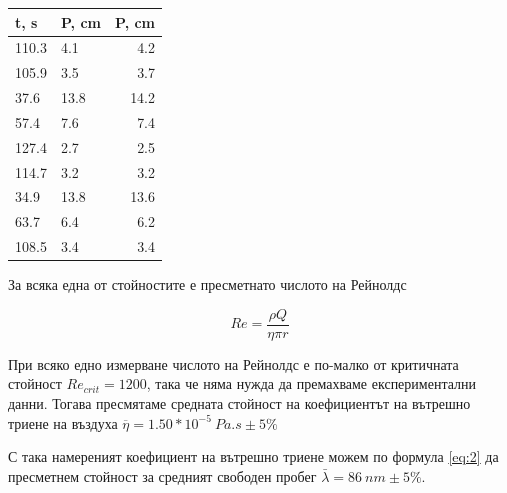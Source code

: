 \documentclass[%
 reprint,
 amsmath,amssymb,
 aps,
]{revtex4-2}
\begin{document}
\begin{table}[H]
    \centering
    \begin{tabular}{@{}llr@{}} \toprule
    t, s  & P, cm & P, cm \\
    \midrule
    110.3 & 4.1        & 4.2        \\
    105.9 & 3.5        & 3.7        \\
    37.6  & 13.8       & 14.2       \\
    57.4  & 7.6        & 7.4        \\
    127.4 & 2.7        & 2.5        \\
    114.7 & 3.2        & 3.2        \\
    34.9  & 13.8       & 13.6       \\
    63.7  & 6.4        & 6.2        \\
    108.5 & 3.4        & 3.4        \\
    \bottomrule
    \end{tabular}%
\end{table}

За всяка една от стойностите е пресметнато числото на Рейнолдс 

\begin{equation*}
    Re = \frac{\rho Q}{\eta \pi r} 
\end{equation*}

При всяко едно измерване числото на Рейнолдс е по-малко от критичната стойност $Re_{crit} = 1200$, така че няма нужда да премахваме експериментални данни. Тогава пресмятаме средната стойност на коефициентът на вътрешно триене на въздуха $\overline{\eta} = 1.50*10^{-5} \ \si{Pa.s} \pm 5\%$

С така намереният коефициент на вътрешно триене можем по формула \eqref{eq:2} да пресметнем стойност за средният свободен пробег $\bar{\lambda} = 86 \ \si{nm} \pm 5\%$.
\end{document}
